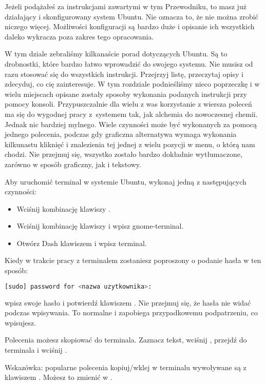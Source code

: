 Jeżeli podążałeś za instrukcjami zawartymi w tym Przewodniku, to masz już działający i skonfigurowany system Ubuntu. Nie oznacza to, że nie można zrobić niczego więcej. Możliwości konfiguracji są bardzo duże i opisanie ich wszystkich daleko wykracza poza zakres tego opracowania.

W tym dziale zebraliśmy kilkanaście porad dotyczących Ubuntu. Są to drobnostki, które bardzo łatwo wprowadzić do swojego systemu. Nie musisz od razu stosować się do wszystkich instrukcji. Przejrzyj listę, przeczytaj opisy i zdecyduj, co cię zainteresuje. W tym rozdziale podnieśliśmy nieco poprzeczkę i w wielu miejscach opisane zostały sposoby wykonania podanych instrukcji przy pomocy konsoli. Przypuszczalnie dla wielu z was korzystanie z wiersza poleceń ma się do wygodnej pracy z~systemem tak, jak alchemia do nowoczesnej chemii. Jednak nic bardziej mylnego. Wiele czynności może być wykonanych za pomocą jednego polecenia, podczas gdy graficzna alternatywa wymaga wykonania kilkunastu kliknięć i znalezienia tej jednej z wielu pozycji w menu, o którą nam chodzi. Nie przejmuj się, wszystko zostało bardzo dokładnie wytłumaczone, zarówno w sposób graficzny, jak i tekstowy.

Aby uruchomić terminal w systemie Ubuntu, wykonaj jedną z następujących czynności:
\begin{itemize}
\item Wciśnij kombinację klawiszy .
\item Wciśnij kombinację klawiszy  i wpisz \textcolor{ubuntu_orange}{gnome-terminal}.
\item Otwórz Dash klawiszem  i wpisz \textcolor{ubuntu_orange}{terminal}.
\end{itemize}

Kiedy w trakcie pracy z terminalem zostaniesz poproszony o podanie hasła w ten sposób:
\begin{lstlisting}[language=bash]
[sudo] password for <nazwa uzytkownika>:
\end{lstlisting}
\noindent wpisz swoje hasło i potwierdź klawiszem \keys{\returnwin}. Nie przejmuj się, że hasła nie widać podczas wpisywania. To normalne i zapobiega przypadkowemu podpatrzeniu, co wpisujesz.

Polecenia możesz skopiować do terminala. Zaznacz tekst, wciśnij , przejdź do terminala i wciśnij .

Wskazówka: popularne polecenia kopiuj/wklej w terminalu wywoływane są z klawiszem . Możesz to zmienić w .
